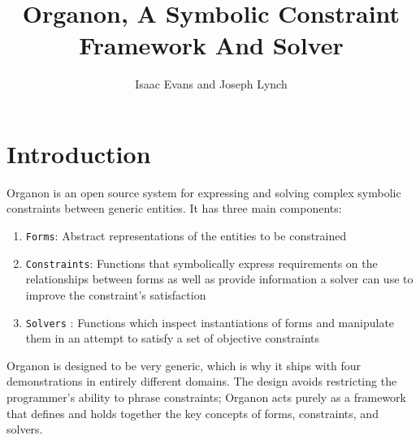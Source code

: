 \documentclass[12pt,a4paper]{article}
\author{Isaac Evans and Joseph Lynch}
\title{Organon, A Symbolic Constraint Framework And Solver}
\begin{document}

\lstset{
 language=Scheme
}

\maketitle
\newpage
\tableofcontents
\newpage
\section{Introduction}
Organon is an open source system for expressing and solving complex symbolic constraints between generic entities. It has three main components: 
\begin{enumerate}
\item \texttt{Forms}: Abstract representations of the entities to be constrained
\item \texttt{Constraints}: Functions that symbolically express requirements on the relationships between forms as well as provide information a solver can use to improve the constraint's satisfaction
\item \texttt{Solvers} : Functions which inspect instantiations of forms and manipulate them in an attempt to satisfy a set of objective constraints
\end{enumerate}

Organon is designed to be very generic, which is why it ships with four demonstrations in entirely different domains. The design avoids restricting the programmer's ability to phrase constraints; Organon acts purely as a framework that defines and holds together the key concepts of forms, constraints, and solvers.
\end{document}
